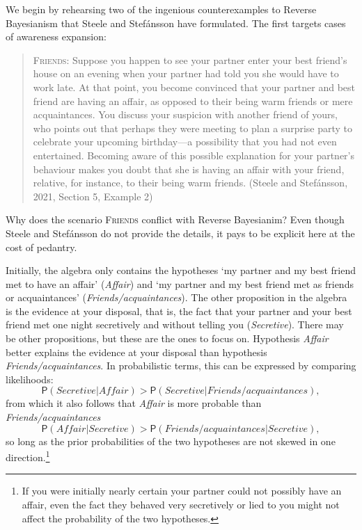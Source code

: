 \documentclass[
  11pt,
  dvipsnames,enabledeprecatedfontcommands]{scrartcl}
\newcommand{\pr}[1]{\ensuremath{\mathsf{P}(#1)}}
\begin{document}
We begin by rehearsing two of the ingenious counterexamples to Reverse
Bayesianism that Steele and Stefánsson have formulated. The first
targets cases of awareness expansion:

\begin{quote}
\textsc{Friends}: Suppose you happen to see your partner enter your best
friend's house on an evening when your partner had told you she would
have to work late. At that point, you become convinced that your partner
and best friend are having an affair, as opposed to their being warm
friends or mere acquaintances. You discuss your suspicion with another
friend of yours, who points out that perhaps they were meeting to plan a
surprise party to celebrate your upcoming birthday---a possibility that
you had not even entertained. Becoming aware of this possible
explanation for your partner's behaviour makes you doubt that she is
having an affair with your friend, relative, for instance, to their
being warm friends. (Steele and Stefánsson, 2021, Section 5, Example 2)
\end{quote}

\noindent Why does the scenario \textsc{Friends} conflict with Reverse
Bayesianim? Even though Steele and Stefánsson do not provide the
details, it pays to be explicit here at the cost of pedantry.

Initially, the algebra only contains the hypotheses `my partner and my
best friend met to have an affair' (\textit{Affair}) and `my partner and
my best friend met as friends or acquaintances'
(\textit{Friends/acquaintances}). The other proposition in the algebra
is the evidence at your disposal, that is, the fact that your partner
and your best friend met one night secretively and without telling you
(\textit{Secretive}). There may be other propositions, but these are the
ones to focus on. Hypothesis \textit{Affair} better explains the
evidence at your disposal than hypothesis
\textit{Friends/acquaintances}. In probabilistic terms, this can be
expressed by comparing likelihoods:
\[\pr{ \textit{Secretive} \vert \textit{Affair}}> \pr{\textit{Secretive} \vert \textit{Friends/acquaintances}},\]
from which it also follows that \textit{Affair} is more probable than
\textit{Friends/acquaintances}
\[\pr{\textit{Affair} \vert  \textit{Secretive} }> \pr{\textit{Friends/acquaintances} \vert \textit{Secretive}}, \tag{>}\]
so long as the prior probabilities of the two hypotheses are not skewed
in one direction.\footnote{If you were initially nearly certain your
  partner could not possibly have an affair, even the fact they behaved
  very secretively or lied to you might not affect the probability of
  the two hypotheses.}
\end{document}
